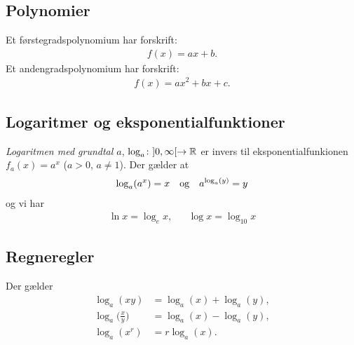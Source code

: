\subsection{Polynomier}
Et førstegradspolynomium har forskrift:
\begin{align*}
f(x)=ax+b.
\end{align*}
Et andengradspolynomium har forskrift:
\begin{align*}
f(x)=ax^2+bx+c.
\end{align*}
\subsection{Logaritmer og eksponentialfunktioner}
\emph{Logaritmen med grundtal $a$}, $\log_a\colon ]0,\infty[\to \mathbb{R}$ er invers til eksponentialfunkionen $f_a(x)=a^x$ ($a>0$, $a\neq 1$). Der gælder at
\begin{align*}
\log_a(a^x)=x\quad \textup{og} \quad a^{\log_a(y)}=y
\end{align*}
og vi har
\begin{align*}
\ln x=\log_e x,&& \log x=\log_{10} x
\end{align*}
\subsection{Regneregler}
Der gælder
\begin{align*}
\log_a(xy)&=\log_a(x)+\log_a(y),\\\log_a\Big(\frac{x}{y}\Big)&=\log_a(x)-\log_a(y),\\ \log_a(x^r)&=r\log_a(x).
\end{align*}
